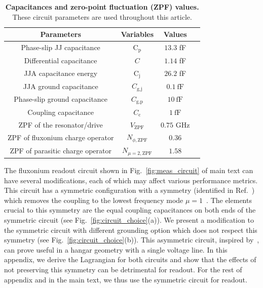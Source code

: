 \documentclass[%
reprint,
superscriptaddress,
 amsmath,amssymb,
 aps,
 prx,
longbibliography,
floatfix,
]{revtex4-2}
\begin{document}
\begin{table}[htb]
    \begin{center}
    \begin{tabular}{|c |c| c |c| }
     \hline
     \textbf{Parameters} & \textbf{Variables} & \textbf{Values}\\ 
    \hline
    Phase-slip JJ capacitance &$\textrm{C}_\textrm{p}$ &$13.3$ fF\\ 
    \hline
    Differential capacitance &$C$ &$1.14$ fF\\ 
    \hline
    JJA capacitance energy&$\textrm{C}_\textrm{j}$&$26.2$ fF\\ 
    \hline
    JJA ground capacitance&$C_\textrm{g,j}$&$0.1 \ \mathrm{fF}$\\ 
    \hline
    Phase-slip ground capacitance&$C_\textrm{g,p}$&$10 \ \mathrm{fF}$\\ 
    \hline
    Coupling capacitance&$C_\textrm{c}$ &$1 \ \mathrm{fF}$\\ 
     \hline
      ZPF of the resonator/drive&$V_{\mathrm{ZPF}}$&$0.75$ GHz\\
     \hline
      ZPF of fluxonium charge operator&$N_{\phi,\mathrm{ZPF}}$&$0.36$\\
     \hline
      ZPF of parasitic charge operator&$N_{\mu=2,\mathrm{ZPF}}$&$1.58$\\
     \hline
    \end{tabular}
    \end{center}
    
    \caption{{\bf Capacitances and zero-point fluctuation (ZPF) values.} These circuit parameters are used throughout this article.}
    \label{tab:params}
    \end{table}
The fluxonium readout circuit shown in Fig.~\ref{fig:meas_circuit} of main text can have several modifications, each of which may affect various performance metrics. This circuit has a symmetric configuration with a symmetry (identified in Ref.~\cite{ferguson2013symmetries}) which removes the coupling to the lowest frequency mode $\mu=1$~\cite{viola2015collective}. The elements crucial to this symmetry are the equal coupling capacitances on both ends of the symmetric circuit (see Fig.~\ref{fig:circuit_choice}(a)). We present a modification to the symmetric circuit with different grounding option which does not respect this symmetry (see Fig.~\ref{fig:circuit_choice}(b)). This asymmetric circuit, inspired by~\cite{zhang_universal_2021}, can prove useful in a hangar geometry with a single voltage line. In this appendix, we derive the Lagrangian for both circuits and show that the effects of not preserving this symmetry can be detrimental for readout. For the rest of appendix and in the main text, we thus use the symmetric circuit for readout.
\end{document}

